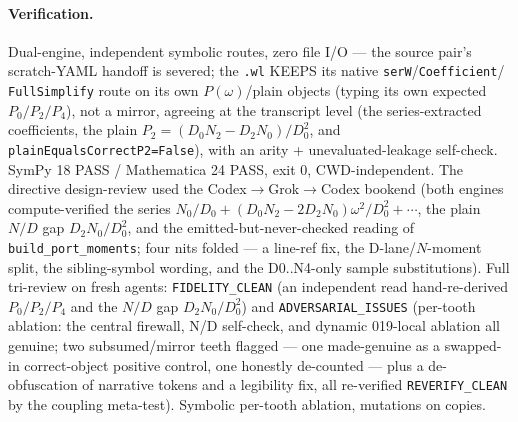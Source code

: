 \paragraph{Verification.}
Dual-engine, independent symbolic routes, zero file I/O --- the source pair's scratch-YAML
handoff is severed; the \texttt{.wl} KEEPS its native \texttt{serW}/\texttt{Coefficient}/
\texttt{FullSimplify} route on its own \(P(\omega)\)/plain objects (typing its own expected
\(P_0/P_2/P_4\)), not a mirror, agreeing at the transcript level (the series-extracted
coefficients, the plain \(P_2=(D_0N_2-D_2N_0)/D_0^2\), and \texttt{plainEqualsCorrectP2=False}),
with an arity + unevaluated-leakage self-check. SymPy 18 PASS / Mathematica 24 PASS, exit 0,
CWD-independent. The directive design-review used the Codex\(\to\)Grok\(\to\)Codex bookend (both
engines compute-verified the series \(N_0/D_0+(D_0N_2-2D_2N_0)\omega^2/D_0^2+\cdots\), the plain
\(N/D\) gap \(D_2N_0/D_0^2\), and the emitted-but-never-checked reading of
\texttt{build\_port\_moments}; four nits folded --- a line-ref fix, the D-lane/\(N\)-moment
split, the sibling-symbol wording, and the D0..N4-only sample substitutions). Full tri-review on
fresh agents: \texttt{FIDELITY\_CLEAN} (an independent read hand-re-derived \(P_0/P_2/P_4\) and
the \(N/D\) gap \(D_2N_0/D_0^2\)) and \texttt{ADVERSARIAL\_ISSUES} (per-tooth ablation: the
central firewall, N/D self-check, and dynamic 019-local ablation all genuine; two subsumed/mirror
teeth flagged --- one made-genuine as a swapped-in correct-object positive control, one
honestly de-counted --- plus a de-obfuscation of narrative tokens and a legibility fix, all
re-verified \texttt{REVERIFY\_CLEAN} by the coupling meta-test). Symbolic per-tooth ablation,
mutations on copies.
